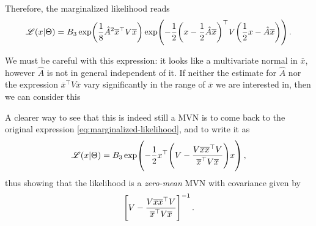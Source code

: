 \documentclass[main.tex]{subfiles}
\begin{document}
Therefore, the marginalized likelihood reads 
%
\begin{align}
\mathscr{L}(x | \Theta ) = B_3 \exp( \frac{1}{8} \hat{A}^2 \overline{x}^{\top} V \overline{x}) \exp(- \frac{1}{2} \qty(x - \frac{1}{2} \hat{A} \overline{x})^{\top} V \qty( \frac{1}{2} x - \hat{A} \overline{x}))
\,.
\end{align}

We must be careful with this expression: it looks like a multivariate normal in \(\overline{x}\), however \(\hat{A}\) is not in general independent of it.
If neither the estimate for \(\hat{A}\) nor the expression \(\overline{x}^{\top} V \overline{x}\) vary significantly in the range of \(\overline{x}\) we are interested in, then we can consider this 

A clearer way to see that this is indeed still a MVN is to come back to the original expression \eqref{eq:marginalized-likelihood}, and to write it as 
%
\begin{align}
\mathscr{L} (x | \Theta ) = B_3 \exp(- \frac{1}{2} x^{\top} \qty(V - \frac{V \overline{x} \overline{x}^{\top} V}{\overline{x}^{\top} V \overline{x}}) x )
\,,
\end{align}
%
thus showing that the likelihood is a \emph{zero-mean} MVN with covariance given by 
%
\begin{align}
\qty[V - \frac{V \overline{x} \overline{x}^{\top} V}{\overline{x}^{\top} V \overline{x}}]^{-1}
\,.
\end{align}
\end{document}
